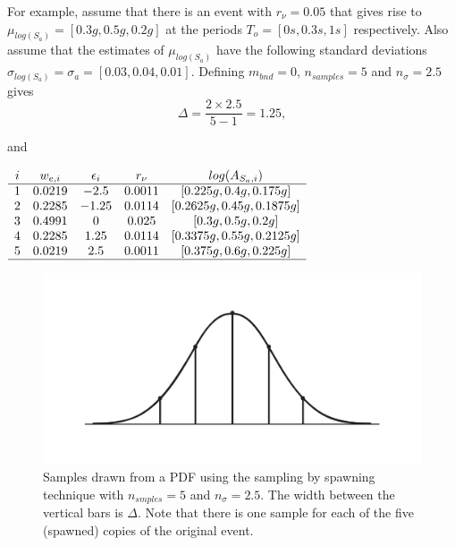 For example, assume that there is an event with $r_\nu=0.05$ that
gives rise to \mbox{$\mu_{log(S_a)}=[0.3g, 0.5g, 0.2g]$} at the
periods \mbox{$T_o = [0s,0.3s,1s]$} respectively. Also assume that
the estimates of $\mu_{log(S_a)}$ have the following standard
deviations \mbox{$\sigma_{log(S_a)}=\sigma_a = [0.03,0.04,0.01]$}.
Defining $m_{bnd}=0$, $n_{samples}=5$ and $n_\sigma=2.5$ gives
\begin{equation}
\Delta = \frac{2 \times 2.5}{5-1} = 1.25,
\end{equation}

and

\begin{center} $ \begin{array}{ccccc}
i & w_{e,i} & \epsilon_i & r_\nu & log(A_{S_a,i}) \\
\hline
1 & 0.0219 & -2.5 & 0.0011 & [0.225g, 0.4g, 0.175g] \\
2 & 0.2285 & -1.25 & 0.0114 & [0.2625g, 0.45g, 0.1875g] \\
3 & 0.4991 & 0 & 0.025 & [0.3g, 0.5g, 0.2g] \\
4 & 0.2285 & 1.25 & 0.0114 & [0.3375g, 0.55g, 0.2125g] \\
5 & 0.0219 & 2.5 & 0.0011 & [0.375g, 0.6g, 0.225g] \\
\hline
\end{array}$
\end{center}

\begin{figure}
\includegraphics[width=1\textwidth]{diags/fig-hattn-spawning}
\caption{Samples drawn from a PDF using the sampling by spawning
technique with $n_{smples}=5$ and $n_\sigma=2.5$. The width between
the vertical bars is $\Delta$. Note that there is one sample for
each of the five (spawned) copies of the original event.}
\label{fig:hattn-spawnsamp}
\end{figure}

